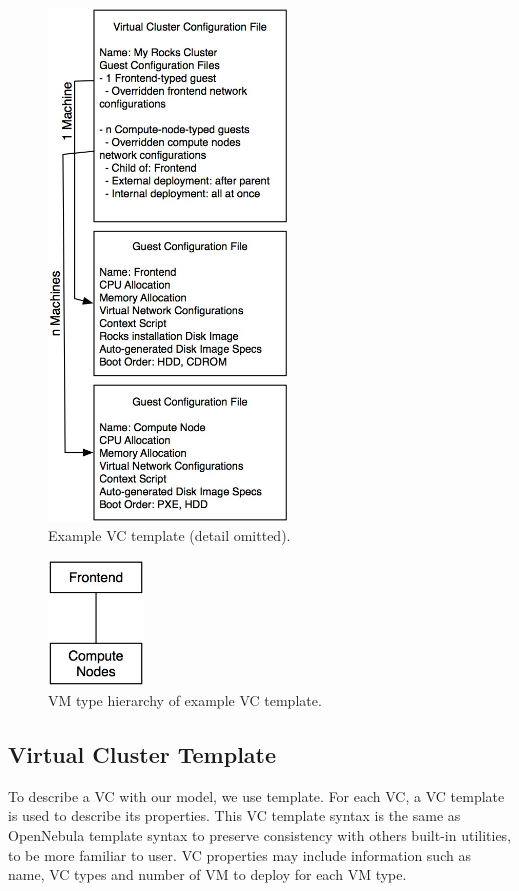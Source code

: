 \documentclass[conference]{IEEEtran}
\begin{document}
\begin{figure}[!t]
\centering
\includegraphics[width=2.5in]{template}
\caption{Example VC template (detail omitted).}
\label{fig:template}
\end{figure}

\begin{figure}[!t]
\centering
\includegraphics[width=1in]{hierarchy}
\caption{VM type hierarchy of example VC template.}
\label{fig:hierarchy}
\end{figure}

\subsection{Virtual Cluster Template}
To describe a VC with our model, we use template.
For each VC, a VC template is used to describe its properties.
This VC template syntax is the same as OpenNebula template syntax to preserve consistency with others built-in utilities, to be more familiar to user.
VC properties may include information such as name, VC types and number of VM to deploy for each VM type.
\end{document}
